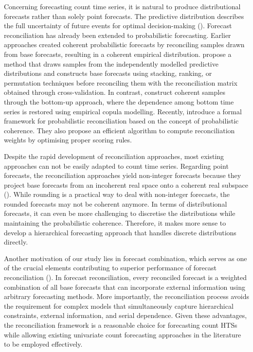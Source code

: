 \documentclass[a4paper,review,12pt,authoryear]{elsarticle}
\theoremstyle{definition}
\begin{document}
Concerning forecasting count time series, it is natural to produce distributional forecasts rather than solely point forecasts.
The predictive distribution describes the full uncertainty of future events for optimal decision-making (\citealp{gneitingProbabilisticForecasting2014}).
Forecast reconciliation has already been extended to probabilistic forecasting.
Earlier approaches created coherent probabilistic forecasts by reconciling samples drawn from base forecasts, resulting in a coherent empirical distribution.
\cite{jeonProbabilisticForecastReconciliation2019} propose a method that draws samples from the independently modelled predictive distributions and constructs base forecasts using stacking, ranking, or permutation techniques before reconciling them with the reconciliation matrix obtained through cross-validation.
In contrast, \cite{bentaiebHierarchicalProbabilisticForecasting2020} construct coherent samples through the bottom-up approach,
where the dependence among bottom time series is restored using empirical copula modelling.
Recently, \cite{panagiotelisProbabilisticForecastReconciliation2022} introduce a formal framework for probabilistic reconciliation based on the concept of probabilistic coherence.
They also propose an efficient algorithm to compute reconciliation weights by optimising proper scoring rules.


Despite the rapid development of reconciliation approaches, most existing approaches can not be easily adapted to count time series.
Regarding point forecasts, the reconciliation approaches yield non-integer forecasts because they project base forecasts from an incoherent real space onto a coherent real subspace (\citealp{panagiotelisForecastReconciliationGeometric2021}).
While rounding is a practical way to deal with non-integer forecasts, the rounded forecasts may not be coherent anymore.
In terms of distributional forecasts, it can even be more challenging to discretise the distributions while maintaining the probabilistic coherence.
Therefore, it makes more sense to develop a hierarchical forecasting approach that handles discrete distributions directly.

Another motivation of our study lies in forecast combination, which serves as one of the crucial elements contributing to superior performance of forecast reconciliation (\citealp{hollymanUnderstandingForecastReconciliation2021}).
In forecast reconciliation, every reconciled forecast is a weighted combination of all base forecasts that can incorporate external information using arbitrary forecasting methods.
More importantly, the reconciliation process avoids the requirement for complex models that simultaneously capture hierarchical constraints, external information, and serial dependence.
Given these advantages, the reconciliation framework is a reasonable choice for forecasting count HTSs while allowing existing univariate count forecasting approaches in the literature to be employed effectively.
\end{document}
